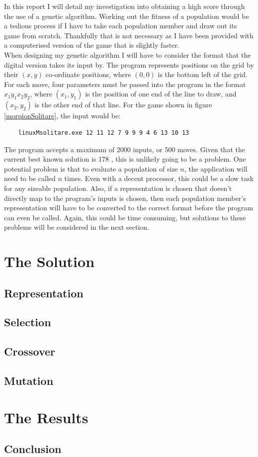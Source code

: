 \documentclass[]{report}
\begin{document}
In this report I will detail my investigation into obtaining a high score through the use of a genetic algorithm. Working out the fitness of a population would be a tedious process if I have to take each population member and draw out its game from scratch. Thankfully that is not necessary as I have been provided with a computerised version of the game that is slightly faster.\\

When designing my genetic algorithm I will have to consider the format that the digital version takes its input by. The program represents positions on the grid by their $(x, y)$ co-ordinate positions, where $(0, 0)$ is the bottom left of the grid. For each move, four parameters must be passed into the program in the format $x_1 y_1 x_2 y_2$, where $(x_1, y_1)$ is the position of one end of the line to draw, and $(x_2, y_2)$ is the other end of that line. For the game shown in figure \ref{morpionSolitare}, the input would be:

\begin{verbatim}
	linuxMsolitare.exe 12 11 12 7 9 9 9 4 6 13 10 13
\end{verbatim}

The program accepts a maximum of 2000 inputs, or 500 moves. Given that the current best known solution is 178 \cite{morpionRecord}, this is unlikely going to be a problem. One potential problem is that to evaluate a population of size $n$, the application will need to be called $n$ times. Even with a decent processor, this could be a slow task for any sizeable population. Also, if a representation is chosen that doesn't directly map to the program's inputs is chosen, then each population member's representation will have to be converted to the correct format before the program can even be called. Again, this could be time consuming, but solutions to these problems will be considered in the next section.


\chapter{The Solution}

\section{Representation}

\section{Selection}

\section{Crossover}

\section{Mutation}

\chapter{The Results}

\section{Conclusion}


\end{document}
